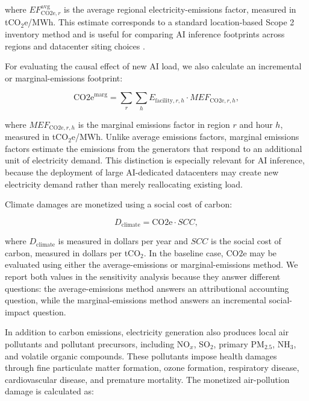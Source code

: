\documentclass{article}
\begin{document}
where $EF^{\mathrm{avg}}_{\mathrm{CO2e},r}$ is the average regional electricity-emissions factor, measured in tCO$_2$e/MWh. This estimate corresponds to a standard location-based Scope 2 inventory method and is useful for comparing AI inference footprints across regions and
datacenter siting choices \citep{ghgprotocol_scope2, epa_egrid}.

For evaluating the causal effect of new AI load, we also calculate an incremental or marginal-emissions footprint:

\begin{equation}
\mathrm{CO2e}^{\mathrm{marg}}
=
\sum_{r}\sum_{h}
E_{\mathrm{facility},r,h}
\cdot
MEF_{\mathrm{CO2e},r,h},
\end{equation}

where $MEF_{\mathrm{CO2e},r,h}$ is the marginal emissions factor in region $r$ and hour $h$, measured in tCO$_2$e/MWh. Unlike average emissions factors, marginal emissions factors estimate the emissions from the generators that respond to an additional unit of electricity demand. This distinction is especially relevant for AI inference, because the deployment of large AI-dedicated datacenters may create new electricity demand rather than merely reallocating existing load.

Climate damages are monetized using a social cost of carbon:

\begin{equation}
D_{\mathrm{climate}}
=
\mathrm{CO2e}
\cdot
SCC,
\end{equation}

where $D_{\mathrm{climate}}$ is measured in dollars per year and $SCC$ is the social cost of carbon, measured in dollars per tCO$_2$. In the baseline case, $\mathrm{CO2e}$ may be evaluated using either the average-emissions or marginal-emissions method. We report both values in the sensitivity analysis because they answer different questions: the average-emissions method answers an attributional accounting question, while the marginal-emissions method answers an incremental social-impact question.

In addition to carbon emissions, electricity generation also produces local air pollutants and pollutant precursors, including NO$_x$, SO$_2$, primary PM$_{2.5}$, NH$_3$, and volatile organic compounds. These pollutants impose health damages through fine particulate matter formation, ozone formation, respiratory disease, cardiovascular disease, and premature mortality. The monetized air-pollution damage is calculated as:
\end{document}
